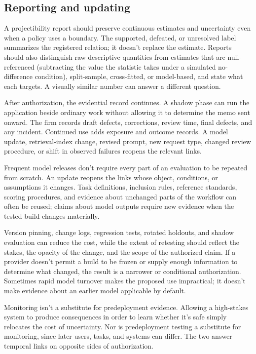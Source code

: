 \documentclass[12pt]{article}
\begin{document}
\subsection{Reporting and updating}\label{ssec:reporting}

A projectibility report should preserve continuous estimates and uncertainty even when a policy uses a boundary. The supported, defeated, or unresolved label summarizes the registered relation; it doesn't replace the estimate. Reports should also distinguish raw descriptive quantities from estimates that are null-referenced (subtracting the value the statistic takes under a simulated no-difference condition), split-sample, cross-fitted, or model-based, and state what each targets. A visually similar number can answer a different question.

After authorization, the evidential record continues. A shadow phase can run the application beside ordinary work without allowing it to determine the memo sent onward. The firm records draft defects, corrections, review time, final defects, and any incident. Continued use adds exposure and outcome records. A model update, retrieval-index change, revised prompt, new request type, changed review procedure, or shift in observed failures reopens the relevant links.

Frequent model releases don't require every part of an evaluation to be repeated from scratch. An update reopens the links whose object, conditions, or assumptions it changes. Task definitions, inclusion rules, reference standards, scoring procedures, and evidence about unchanged parts of the workflow can often be reused; claims about model outputs require new evidence when the tested build changes materially.

Version pinning, change logs, regression tests, rotated holdouts, and shadow evaluation can reduce the cost, while the extent of retesting should reflect the stakes, the opacity of the change, and the scope of the authorized claim. If a provider doesn't permit a build to be frozen or supply enough information to determine what changed, the result is a narrower or conditional authorization. Sometimes rapid model turnover makes the proposed use impractical; it doesn't make evidence about an earlier model applicable by default.

Monitoring isn't a substitute for predeployment evidence. Allowing a high-stakes system to produce consequences in order to learn whether it's safe simply relocates the cost of uncertainty. Nor is predeployment testing a substitute for monitoring, since later users, tasks, and systems can differ. The two answer temporal links on opposite sides of authorization.
\end{document}
